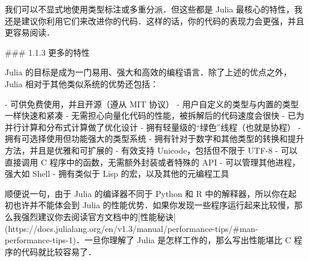 我们可以不显式地使用类型标注或多重分派．但这些都是 Julia 最核心的特性，我还是建议你利用它们来改进你的代码．这样的话，你的代码的表现力会更强，并且更容易阅读．

### 1.1.3 更多的特性

Julia 的目标是成为一门易用、强大和高效的编程语言．除了上述的优点之外，Julia 相对于其他类似系统的优势还包括：

- 可供免费使用，并且开源（遵从 MIT 协议）
- 用户自定义的类型与内置的类型一样快速和紧凑
- 无需担心向量化代码的性能，被拆解后的代码速度会很快
- 已为并行计算和分布式计算做了优化设计
- 拥有轻量级的“绿色”线程（也就是协程）
- 拥有可选择使用但功能强大的类型系统
- 拥有针对于数字和其他类型的转换和提升方法，并且是优雅和可扩展的
- 有效支持 Unicode，包括但不限于 UTF-8
- 可以直接调用 C 程序中的函数，无需额外封装或者特殊的 API
- 可以管理其他进程，强大如 Shell
- 拥有类似于 Lisp 的宏，以及其他的元编程工具

顺便说一句，由于 Julia 的编译器不同于 Python 和 R 中的解释器，所以你在起初也许并不能体会到 Julia 的性能优势．如果你发现一些程序运行起来比较慢，那么我强烈建议你去阅读官方文档中的[性能秘诀](https://docs.julialang.org/en/v1.3/manual/performance-tips/#man-performance-tips-1)．一旦你理解了 Julia 是怎样工作的，那么写出性能堪比 C 程序的代码就比较容易了．